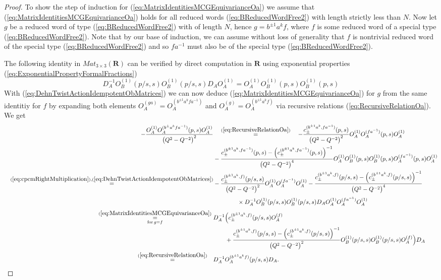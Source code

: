 \documentclass{amsart}
\begin{document}
\begin{proof}
To show the step of induction for (\ref{eq:MatrixIdentitiesMCGEquivarianceOa}) we assume that (\ref{eq:MatrixIdentitiesMCGEquivarianceOa}) holds for all reduced words (\ref{eq:BReducedWordFree2}) with length strictly less than $N$. Now let $g$ be a reduced word of type (\ref{eq:BReducedWordFree2}) with of length $N$, hence $g=b^{\pm1}a^kf$, where $f$ is some reduced word of a special type (\ref{eq:BReducedWordFree2}). Note that by our base of induction, we can assume without loss of generality that $f$ is nontrivial reduced word of the special type (\ref{eq:BReducedWordFree2}) and so $fa^{-1}$ must also be of the special type (\ref{eq:BReducedWordFree2}).

The following identity in $Mat_{3\times3}(\mathbf R)$ can be verified by direct computation in $\mathbf R$ using exponential properties (\ref{eq:ExponentialPropertyFormalFractions})
\begin{equation}
D_A^{-1}O_B^{(1)}(p/s,s)O_B^{(1)}(p/s,s)D_AO_A^{(1)}=O_A^{(1)}O_B^{(1)}(p,s)O_B^{(1)}(p,s)
\label{eq:DehnTwistActionIdempotentObMatrices}
\end{equation} With (\ref{eq:DehnTwistActionIdempotentObMatrices}) we can now deduce (\ref{eq:MatrixIdentitiesMCGEquivarianceOa}) for $g$ from the same identitiy for $f$ by expanding both elements $O_A^{(ga)}=O_A^{(b^{\pm1}a^kfa^{-1})}$ and $O_A^{(g)}=O_A^{(b^{\pm1}a^kf)}$ via recursive relations (\ref{eq:RecursiveRelationOa}). We get
\begin{align*}
-\frac{O_A^{(1)}O_A^{(b^{\pm}a^kfa^{-1})}(p,s)O_A^{(1)}}{\big(Q^2-Q^{-2}\big)^2}&\quad\overset{(\ref{eq:RecursiveRelationOa})}{=}\quad-\frac{c_{\pm}^{(b^{\pm1}a^k,fa^{-1})}(p,s)}{\big(Q^2-Q^{-2}\big)^2}O_A^{(1)}O_A^{(fa^{-1})}(p,s)O_A^{(1)}\\
&-\frac{c_{\pm}^{(b^{\pm1}a^k,fa^{-1})}(p,s)-\left(c_{\pm}^{(b^{\pm1}a^k,fa^{-1})}(p,s)\right)^{-1}}{\big(Q^2-Q^{-2}\big)^4} O_A^{(1)}O_B^{(1)}(p,s)O_B^{(1)}(p,s)O_A^{(fa^{-1})}(p,s)O_A^{(1)}\\
\quad\overset{(\ref{eq:cpcmRightMultiplication}),(\ref{eq:DehnTwistActionIdempotentObMatrices})}{=}&-\frac{c_{\pm}^{(b^{\pm1}a^k,f)}(p/s,s)}{\big(Q^2-Q^{-2}\big)^2}O_A^{(1)}O_A^{(fa^{-1})}O_A^{(1)}-\frac{c_{\pm}^{(b^{\pm1}a^k,f)}(p/s,s)-\left(c_{\pm}^{(b^{\pm1}a^k,f)}(p/s,s)\right)^{-1}}{\big(Q^2-Q^{-2}\big)^4}\\[0.25em]
&\qquad\qquad\times D_A^{-1}O_B^{(1)}(p/s,s)O_B^{(1)}(p/s,s)D_AO_A^{(1)}O_A^{(fa^{-1})}O_A^{(1)}\\[0.25em]
\overset{(\ref{eq:MatrixIdentitiesMCGEquivarianceOa})}{\underset{\textrm{for}\,g=f}{=}}\;&D_A^{-1}\Big(c_{\pm}^{(b^{\pm1}a^k,f)}(p/s,s)O_A^{(f)}\\
&\qquad+\frac{c_{\pm}^{(b^{\pm1}a^k,f)}(p/s,s)-\left(c_{\pm}^{(b^{\pm1}a^k,f)}(p/s,s)\right)^{-1}}{\big(Q^2-Q^{-2}\big)^2}O_B^{(1)}(p/s,s)O_B^{(1)}(p/s,s)O_A^{(f)}\Big)D_A\\
\overset{(\ref{eq:RecursiveRelationOa})}{=}\quad&D_A^{-1}O_A^{(b^{\pm1}a^kf)}(p/s,s)D_A.
\end{align*}


\end{proof}
\end{document}
